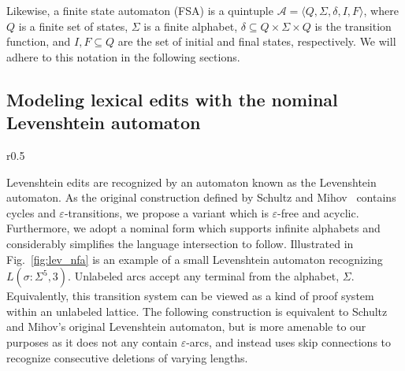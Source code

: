 \documentclass[runningheads]{llncs}
\begin{document}
  Likewise, a finite state automaton (FSA) is a quintuple $\mathcal{A} = \langle Q, \Sigma, \delta, I, F\rangle$, where $Q$ is a finite set of states, $\Sigma$ is a finite alphabet, $\delta \subseteq Q \times \Sigma \times Q$ is the transition function, and $I, F \subseteq Q$ are the set of initial and final states, respectively. We will adhere to this notation in the following sections.

  \clearpage\subsection{Modeling lexical edits with the nominal Levenshtein automaton}\label{sec:lev_nfa}

  \begin{wrapfigure}{r}{0.5\textwidth}
    \vspace{-0.3cm}
    \begin{center}
      
    \end{center}
    \caption{NFA recognizing Levenshtein $L(\sigma: \Sigma^5, 3)$.}\label{fig:lev_nfa}
    \vspace{-0.5cm}
  \end{wrapfigure}

  Levenshtein edits are recognized by an automaton known as the Levenshtein automaton. As the original construction defined by Schultz and Mihov~\cite{schulz2002fast} contains cycles and $\varepsilon$-transitions, we propose a variant which is $\varepsilon$-free and acyclic. Furthermore, we adopt a nominal form which supports infinite alphabets and considerably simplifies the language intersection to follow. Illustrated in Fig.~\ref{fig:lev_nfa} is an example of a small Levenshtein automaton recognizing $L(\sigma: \Sigma^5, 3)$. Unlabeled arcs accept any terminal from the alphabet, $\Sigma$. Equivalently, this transition system can be viewed as a kind of proof system within an unlabeled lattice. The following construction is equivalent to Schultz and Mihov's original Levenshtein automaton, but is more amenable to our purposes as it does not any contain $\varepsilon$-arcs, and instead uses skip connections to recognize consecutive deletions of varying lengths.
\end{document}
